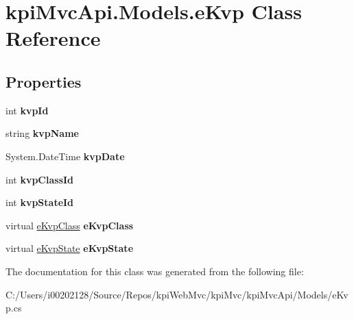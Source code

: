 \hypertarget{classkpi_mvc_api_1_1_models_1_1e_kvp}{}\section{kpi\+Mvc\+Api.\+Models.\+e\+Kvp Class Reference}
\label{classkpi_mvc_api_1_1_models_1_1e_kvp}
\subsection*{Properties}
\begin{DoxyCompactItemize}
\item 
\mbox{\label{classkpi_mvc_api_1_1_models_1_1e_kvp_a1cf6b13ebfff0d4db61e78f4fe8e603e}} 
int {\bfseries kvp\+Id}
\item 
\mbox{\label{classkpi_mvc_api_1_1_models_1_1e_kvp_afa01efa6bf5de597d7f7a6db6ad15758}} 
string {\bfseries kvp\+Name}
\item 
\mbox{\label{classkpi_mvc_api_1_1_models_1_1e_kvp_a1f1729c75df0c3e70c65c947766128b3}} 
System.\+Date\+Time {\bfseries kvp\+Date}
\item 
\mbox{\label{classkpi_mvc_api_1_1_models_1_1e_kvp_a8526536bba1fefa2e974707202aad153}} 
int {\bfseries kvp\+Class\+Id}
\item 
\mbox{\label{classkpi_mvc_api_1_1_models_1_1e_kvp_a8ab577f1a53075ea122d4f15fb8e8dab}} 
int {\bfseries kvp\+State\+Id}
\item 
\mbox{\label{classkpi_mvc_api_1_1_models_1_1e_kvp_a870831d414529ad1ca99340a6ab0fab5}} 
virtual \hyperlink{classkpi_mvc_api_1_1_models_1_1e_kvp_class}{e\+Kvp\+Class} {\bfseries e\+Kvp\+Class}
\item 
\mbox{\label{classkpi_mvc_api_1_1_models_1_1e_kvp_a787924e046668870969b5734a1357f15}} 
virtual \hyperlink{classkpi_mvc_api_1_1_models_1_1e_kvp_state}{e\+Kvp\+State} {\bfseries e\+Kvp\+State}
\end{DoxyCompactItemize}


The documentation for this class was generated from the following file\+:\begin{DoxyCompactItemize}
\item 
C\+:/\+Users/i00202128/\+Source/\+Repos/kpi\+Web\+Mvc/kpi\+Mvc/kpi\+Mvc\+Api/\+Models/e\+Kvp.\+cs\end{DoxyCompactItemize}
